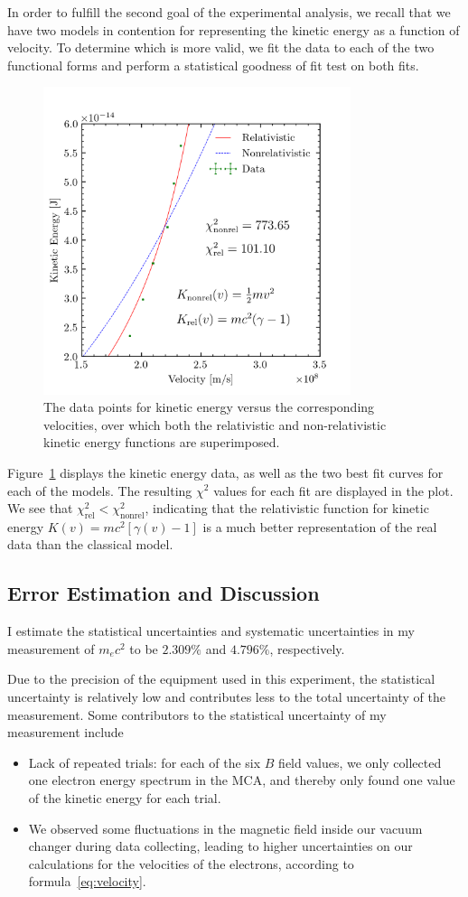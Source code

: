 \documentclass[aps,twocolumn,secnumarabic,balancelastpage,amsmath,amssymb,nofootinbib, floatfix]{revtex4-2}
\begin{document}
	In order to fulfill the second goal of the experimental analysis, we recall that we have two models in contention for representing the kinetic energy as a function of velocity. To determine which is more valid, we fit the data to each of the two functional forms and perform a statistical goodness of fit test on both fits. 
	\begin{figure}
		\includegraphics[width=9cm]{model_data_comparison.png}
		\caption{The data points for kinetic energy versus the corresponding velocities, over which both the relativistic and non-relativistic kinetic energy functions are superimposed.}
		\label{fig:modeldata}
	\end{figure}

	
	Figure~\ref{fig:modeldata} displays the kinetic energy data, as well as the two best fit curves for each of the models. The resulting $\chi^{2}$ values for each fit are displayed in the plot. We see that $\chi^{2}_{\text{rel}}<\chi^{2}_{\text{nonrel}}$, indicating that the relativistic function for kinetic energy $K(v)=mc^{2}[\gamma(v)-1]$ is a much better representation of the real data than the classical model.
	
	
	\subsection{Error Estimation and Discussion}
	I estimate the statistical uncertainties and systematic uncertainties in my measurement of $m_{e}c^{2}$ to be $2.309\%$ and $4.796\%$, respectively. 
	
	Due to the precision of the equipment used in this experiment, the statistical uncertainty is relatively low and contributes less to the total uncertainty of the measurement. Some contributors to the statistical uncertainty of my measurement include
	\begin{itemize}
		\item Lack of repeated trials: for each of the six $B$ field values, we only collected one electron energy spectrum in the MCA, and thereby only found one value of the kinetic energy for each trial. 
		\item We observed some fluctuations in the magnetic field inside our vacuum changer during data collecting, leading to higher uncertainties on our calculations for the velocities of the electrons, according to formula~\ref{eq:velocity}. 
	\end{itemize}
	
\end{document}
